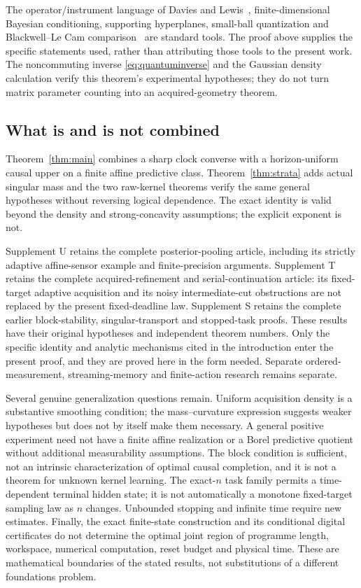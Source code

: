 The operator/instrument language of Davies and Lewis~\cite{davies}, finite-dimensional Bayesian conditioning, supporting hyperplanes, small-ball quantization and Blackwell--Le Cam comparison~\cite{blackwell,lecam} are standard tools. The proof above supplies the specific statements used, rather than attributing those tools to the present work. The noncommuting inverse \eqref{eq:quantuminverse} and the Gaussian density calculation verify this theorem's experimental hypotheses; they do not turn matrix parameter counting into an acquired-geometry theorem.

\subsection{What is and is not combined}
Theorem~\ref{thm:main} combines a sharp clock converse with a horizon-uniform causal upper on a finite affine predictive class. Theorem~\ref{thm:strata} adds actual singular mass and the two raw-kernel theorems verify the same general hypotheses without reversing logical dependence. The exact identity is valid beyond the density and strong-concavity assumptions; the explicit exponent is not.

Supplement U retains the complete posterior-pooling article, including its strictly adaptive affine-sensor example and finite-precision arguments. Supplement T retains the complete acquired-refinement and serial-continuation article: its fixed-target adaptive acquisition and its noisy intermediate-cut obstructions are not replaced by the present fixed-deadline law. Supplement S retains the complete earlier block-stability, singular-transport and stopped-task proofs. These results have their original hypotheses and independent theorem numbers. Only the specific identity and analytic mechanisms cited in the introduction enter the present proof, and they are proved here in the form needed. Separate ordered-measurement, streaming-memory and finite-action research remains separate.

Several genuine generalization questions remain. Uniform acquisition density is a substantive smoothing condition; the mass--curvature expression suggests weaker hypotheses but does not by itself make them necessary. A general positive experiment need not have a finite affine realization or a Borel predictive quotient without additional measurability assumptions. The block condition is sufficient, not an intrinsic characterization of optimal causal completion, and it is not a theorem for unknown kernel learning. The exact-$n$ task family permits a time-dependent terminal hidden state; it is not automatically a monotone fixed-target sampling law as $n$ changes. Unbounded stopping and infinite time require new estimates. Finally, the exact finite-state construction and its conditional digital certificates do not determine the optimal joint region of programme length, workspace, numerical computation, reset budget and physical time. These are mathematical boundaries of the stated results, not substitutions of a different foundations problem.
